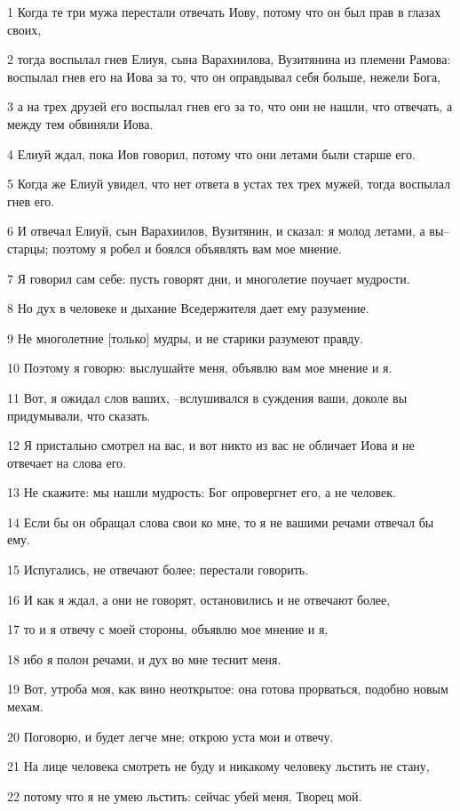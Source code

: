 \par 1 Когда те три мужа перестали отвечать Иову, потому что он был прав в глазах своих,
\par 2 тогда воспылал гнев Елиуя, сына Варахиилова, Вузитянина из племени Рамова: воспылал гнев его на Иова за то, что он оправдывал себя больше, нежели Бога,
\par 3 а на трех друзей его воспылал гнев его за то, что они не нашли, что отвечать, а между тем обвиняли Иова.
\par 4 Елиуй ждал, пока Иов говорил, потому что они летами были старше его.
\par 5 Когда же Елиуй увидел, что нет ответа в устах тех трех мужей, тогда воспылал гнев его.
\par 6 И отвечал Елиуй, сын Варахиилов, Вузитянин, и сказал: я молод летами, а вы--старцы; поэтому я робел и боялся объявлять вам мое мнение.
\par 7 Я говорил сам себе: пусть говорят дни, и многолетие поучает мудрости.
\par 8 Но дух в человеке и дыхание Вседержителя дает ему разумение.
\par 9 Не многолетние [только] мудры, и не старики разумеют правду.
\par 10 Поэтому я говорю: выслушайте меня, объявлю вам мое мнение и я.
\par 11 Вот, я ожидал слов ваших, --вслушивался в суждения ваши, доколе вы придумывали, что сказать.
\par 12 Я пристально смотрел на вас, и вот никто из вас не обличает Иова и не отвечает на слова его.
\par 13 Не скажите: мы нашли мудрость: Бог опровергнет его, а не человек.
\par 14 Если бы он обращал слова свои ко мне, то я не вашими речами отвечал бы ему.
\par 15 Испугались, не отвечают более; перестали говорить.
\par 16 И как я ждал, а они не говорят, остановились и не отвечают более,
\par 17 то и я отвечу с моей стороны, объявлю мое мнение и я,
\par 18 ибо я полон речами, и дух во мне теснит меня.
\par 19 Вот, утроба моя, как вино неоткрытое: она готова прорваться, подобно новым мехам.
\par 20 Поговорю, и будет легче мне; открою уста мои и отвечу.
\par 21 На лице человека смотреть не буду и никакому человеку льстить не стану,
\par 22 потому что я не умею льстить: сейчас убей меня, Творец мой.

